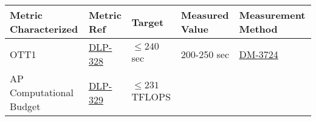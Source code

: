 \begin{longtable}[]{@{}lllll@{}}
\toprule
\begin{minipage}[b]{0.22\columnwidth}\raggedright\strut
Metric Characterized\strut
\end{minipage} & \begin{minipage}[b]{0.11\columnwidth}\raggedright\strut
Metric Ref\strut
\end{minipage} & \begin{minipage}[b]{0.21\columnwidth}\raggedright\strut
Target\strut
\end{minipage} & \begin{minipage}[b]{0.14\columnwidth}\raggedright\strut
Measured Value\strut
\end{minipage} & \begin{minipage}[b]{0.17\columnwidth}\raggedright\strut
Measurement Method\strut
\end{minipage}\tabularnewline
\midrule
\endhead
\begin{minipage}[t]{0.22\columnwidth}\raggedright\strut
OTT1\strut
\end{minipage} & \begin{minipage}[t]{0.11\columnwidth}\raggedright\strut
\href{https://jira.lsstcorp.org/browse/DLP-328}{DLP-328}\strut
\end{minipage} & \begin{minipage}[t]{0.21\columnwidth}\raggedright\strut
\(\leq 240\) sec\strut
\end{minipage} & \begin{minipage}[t]{0.14\columnwidth}\raggedright\strut
200-250 sec\strut
\end{minipage} & \begin{minipage}[t]{0.17\columnwidth}\raggedright\strut
\href{https://jira.lsstcorp.org/browse/DM-3724}{DM-3724}\strut
\end{minipage}\tabularnewline
\begin{minipage}[t]{0.22\columnwidth}\raggedright\strut
AP Computational Budget\strut
\end{minipage} & \begin{minipage}[t]{0.11\columnwidth}\raggedright\strut
\href{https://jira.lsstcorp.org/browse/DLP-329}{DLP-329}\strut
\end{minipage} & \begin{minipage}[t]{0.21\columnwidth}\raggedright\strut
\(\leq 231\) TFLOPS\strut
\end{minipage} & \begin{minipage}[t]{0.14\columnwidth}\raggedright\strut

\end{minipage}
\end{longtable}
